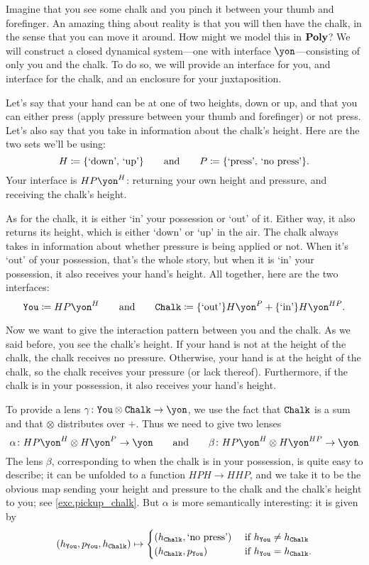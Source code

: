 \documentclass[Book-Poly]{subfiles}
\begin{document}
\begin{example}\label{ex.pickup_chalk}
Imagine that you see some chalk and you pinch it between your thumb and forefinger.
An amazing thing about reality is that you will then have the chalk, in the sense that you can move it around.
How might we model this in $\mathbf{Poly}$?
We will construct a closed dynamical system---one with interface $\yon$---consisting of only you and the chalk.
To do so, we will provide an interface for you, and interface for the chalk, and an enclosure for your juxtaposition.

Let's say that your hand can be at one of two heights, down or up, and that you can either press (apply pressure between your thumb and forefinger) or not press. Let's also say that you take in information about the chalk's height. Here are the two sets we'll be using:
\[
	H\coloneqq\{\text{`down', `up'}\}
	\qquad\text{and}\qquad
	P\coloneqq\{\text{`press', `no press'}\}.
\]
Your interface is $HP\yon^H$: returning your own height and pressure, and receiving the chalk's height.

As for the chalk, it is either `in' your possession or `out' of it.
Either way, it also returns its height, which is either `down' or `up' in the air.
The chalk always takes in information about whether pressure is being applied or not.
When it's `out' of your possession, that's the whole story, but when it is `in' your possession, it also receives your hand's height.
All together, here are the two interfaces:
\[
	\const{You}\coloneqq HP\yon^H
	\qqand
	\const{Chalk}\coloneqq \{\text{`out'}\}H\yon^P + \{\text{`in'}\}H\yon^{HP}.
\]

Now we want to give the interaction pattern between you and the chalk.
As we said before, you see the chalk's height.
If your hand is not at the height of the chalk, the chalk receives no pressure.
Otherwise, your hand is at the height of the chalk, so the chalk receives your pressure (or lack thereof).
Furthermore, if the chalk is in your possession, it also receives your hand's height.

To provide a lens $\gamma\colon\const{You}\otimes\const{Chalk}\to\yon$, we use the fact that $\texttt{Chalk}$ is a sum and that $\otimes$ distributes over $+$.
Thus we need to give two lenses
\[
	\alpha\colon HP\yon^H\otimes H\yon^P\to\yon
	\qqand
	\beta\colon HP\yon^H\otimes H\yon^{HP}\to\yon
\]
The lens $\beta$, corresponding to when the chalk is in your possession, is quite easy to describe; it can be unfolded to a function
$HPH\to HHP$, and we take it to be the obvious map sending your height and pressure to the chalk and the chalk's height to you; see \cref{exc.pickup_chalk}. But $\alpha$ is more semantically interesting: it is given by
\[
  (h_{\texttt{You}},p_{\texttt{You}},h_{\texttt{Chalk}})\mapsto
  \begin{cases}
  	(h_{\texttt{Chalk}},\text{`no press'}) & \textnormal{ if } h_{\texttt{You}} \neq h_{\texttt{Chalk}} \\
  	(h_{\texttt{Chalk}},p_{\texttt{You}}) & \textnormal{ if } h_{\texttt{You}} = h_{\texttt{Chalk}}.
  \end{cases}
\]


\end{example}
\end{document}
